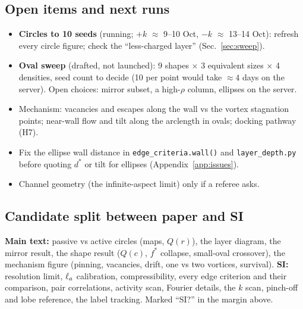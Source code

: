 \subsection{Open items and next runs}
\begin{itemize}
  \item \textbf{Circles to 10 seeds} (running; $+k$ $\approx$ 9--10 Oct, $-k$ $\approx$ 13--14 Oct): refresh every circle figure; check the
        ``less-charged layer'' (Sec.~\ref{sec:sweep}).
  \item \textbf{Oval sweep} (drafted, not launched): 9 shapes $\times$ 3 equivalent sizes $\times$ 4 densities, seed count to decide
        (10 per point would take $\approx4$ days on the server). Open choices: mirror subset, a high-$\rho$ column, ellipses on the server.
  \item Mechanism: vacancies and escapes along the wall vs the vortex stagnation points; near-wall flow and tilt along the arclength in
        ovals; docking pathway (H7).
  \item Fix the ellipse wall distance in \texttt{edge\_criteria.wall()} and \texttt{layer\_depth.py} before quoting $d^*$ or tilt for
        ellipses (Appendix~\ref{app:issues}).
  \item Channel geometry (the infinite-aspect limit) only if a referee asks.
\end{itemize}
\subsection{Candidate split between paper and SI}
\textbf{Main text:} passive vs active circles (maps, $Q(r)$), the layer diagram, the mirror result, the shape result ($Q(c)$, $f^*$
collapse, small-oval crossover), the mechanism figure (pinning, vacancies, drift, one vs two vortices, survival).
\textbf{SI:} resolution limit, $\ell_a$ calibration, compressibility, every edge criterion and their comparison, pair correlations,
activity scan, Fourier details, the $k$ scan, pinch-off and lobe reference, the label tracking. Marked ``SI?'' in the margin above.
